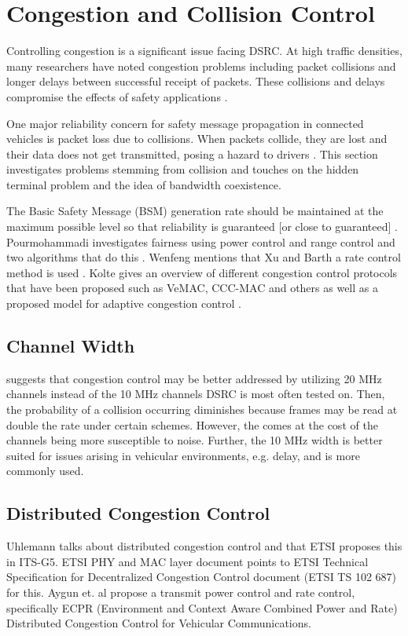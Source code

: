 \documentclass[twoside,conference]{IEEEtran}
\begin{document}
\section{Congestion and Collision Control}\label{sec:congestioncollision}
	Controlling congestion is a significant issue facing DSRC. At high traffic densities, many researchers have noted congestion problems including packet collisions and longer delays between successful receipt of packets. These collisions and delays compromise the effects of safety applications \cite{Subramanian2012}.
	
	One major reliability concern for safety message propagation in connected vehicles is packet loss due to collisions. When packets collide, they are lost and their data does not get transmitted, posing a hazard to drivers \cite{Hassan2011}. This section investigates problems stemming from collision and touches on the hidden terminal problem and the idea of bandwidth coexistence. 
	
	The Basic Safety Message (BSM) generation rate should be maintained at the maximum possible level so that reliability is guaranteed [or close to guaranteed] \cite{Wenfeng2014}.  Pourmohammadi investigates fairness using power control and range control and two algorithms that do this \cite{Pourmohammadi2015}.  Wenfeng mentions that Xu and Barth a rate control method is used \cite{Wenfeng2014,Xu2004-2}.  Kolte gives an overview of different congestion control protocols that have been proposed such as VeMAC, CCC-MAC and others as well as a proposed model for adaptive congestion control \cite{Kolte2014}. \\

	\subsection{Channel Width}\label{sec:channelwidth}
		\cite{Kenney2011} suggests that congestion control may be better addressed by utilizing 20 MHz channels instead of the 10 MHz channels DSRC is most often tested on. Then, the probability of a collision occurring diminishes because frames may be read at double the rate under certain schemes. However, the comes at the cost of the channels being more susceptible to noise. Further, the 10 MHz width is better suited for issues arising in vehicular environments, e.g. delay, and is more commonly used.

	\subsection{Distributed Congestion Control}\label{sec:distributedcongestion}
		Uhlemann talks about distributed congestion control and that ETSI proposes this in ITS-G5\cite{Uhlemann2015}.  ETSI PHY and MAC layer document \cite{ETSI-ES202663} points to ETSI Technical Specification for Decentralized Congestion Control document (ETSI TS 102 687) for this\cite{ETSI-TS102687}.  Aygun et. al propose a transmit power control and rate control, specifically ECPR (Environment and Context Aware Combined Power and Rate) Distributed Congestion Control for Vehicular Communications\cite{Aygun2015}.
		
\end{document}
